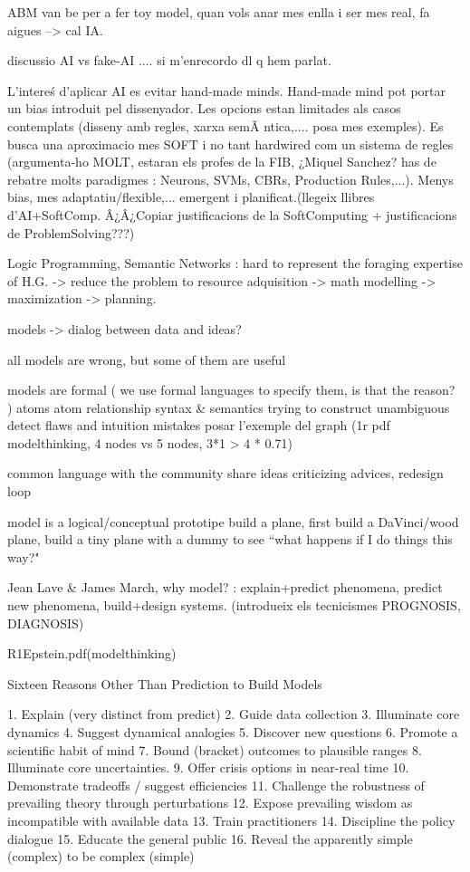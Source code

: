 \documentclass{report}
\begin{document}



ABM van be per a fer toy model, quan vols anar mes enlla i ser mes real, fa aigues --> cal IA.

discussio AI vs fake-AI .... si m'enrecordo dl q hem parlat.

L'intere\'s d'aplicar AI es evitar hand-made minds. Hand-made mind pot portar un bias introduit pel dissenyador.
Les opcions estan limitades als casos contemplats (disseny amb regles, xarxa semÃ ntica,.... posa mes exemples).
Es busca una aproximacio mes SOFT i no tant hardwired com un sistema de regles (argumenta-ho MOLT,
estaran els profes de la FIB, ¿Miquel Sanchez? has de rebatre molts paradigmes : Neurons, SVMs, CBRs, Production Rules,...). 
Menys bias, mes adaptatiu/flexible,... emergent i planificat.(llegeix llibres d'AI+SoftComp. Â¿Â¿Copiar justificacions de la SoftComputing + justificacions de ProblemSolving???)

Logic Programming, Semantic Networks : hard to represent the foraging expertise of H.G. -> reduce the problem to 
resource adquisition -> math modelling -> maximization -> planning.

models -> dialog between data and ideas?

all models are wrong, but some of them are useful

models are formal ( we use formal languages to specify them, is that the reason? )
	atoms
	atom relationship
	syntax \& semantics
		trying to construct unambiguous 
	detect flaws and intuition mistakes
		posar l'exemple del graph (1r pdf modelthinking, 4 nodes vs 5 nodes, 3*1 > 4 * 0.71)
	
	common language with the community
			share ideas
			criticizing
			advices, redesign loop

	model is a logical/conceptual prototipe
		build a plane, first build a DaVinci/wood plane, build a tiny plane with a dummy
		to see ``what happens if I do things this way?"
	
Jean Lave \& James March, why model? : explain+predict phenomena, predict new phenomena, build+design systems.
(introdueix els tecnicismes PROGNOSIS, DIAGNOSIS)

R1Epstein.pdf(modelthinking){
Sixteen Reasons Other Than Prediction to Build Models

1. Explain (very distinct from predict)
2. Guide data collection
3. Illuminate core dynamics
4. Suggest dynamical analogies
5. Discover new questions
6. Promote a scientific habit of mind
7. Bound (bracket) outcomes to plausible ranges
8. Illuminate core uncertainties.
9. Offer crisis options in near-real time
10. Demonstrate tradeoffs / suggest efficiencies
11. Challenge the robustness of prevailing theory through perturbations
12. Expose prevailing wisdom as incompatible with available data
13. Train practitioners
14. Discipline the policy dialogue
15. Educate the general public
16. Reveal the apparently simple (complex) to be complex (simple)
}
\end{document}
